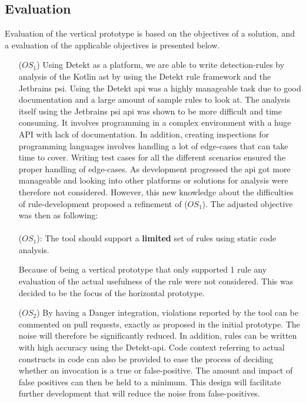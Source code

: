 \documentclass{report}
\begin{document}
\subsection*{Evaluation}
Evaluation of the vertical prototype is based on the objectives of a solution, and a evaluation of the applicable objectives is presented below.
\begin{itemize}
    \item [(\(OS_{1}\))] Using Detekt as a platform, we are able to write detection-rules by analysis of the Kotlin \gls{ast} by using the Detekt rule framework and the  Jetbrains \gls{psi}. Using the Detekt \gls{api} was a highly manageable task due to good documentation and a large amount of sample rules to look at. The analysis itself using the Jetbrains \gls{psi} \gls{api} was shown to be more difficult and time consuming. It involves programming in a complex environment with a huge API with lack of documentation. In addition, creating inspections for programming languages involves handling a lot of edge-cases that can take time to cover. Writing test cases for all the different scenarios ensured the proper handling of edge-cases. As development progressed the \gls{api} got more manageable and looking into other platforms or solutions for analysis were therefore not considered. However, this new knowledge about the difficulties of rule-development proposed a refinement of (\(OS_{1}\)). The adjusted objective was then as following: \\\\(\(OS_{1}\)): The tool should  support a \textbf{limited} set of rules using static code analysis. \label{vertical-os1}
    
    Because of being a vertical prototype that only supported 1 rule any evaluation of the actual usefulness of the rule were not considered. This was decided to be the focus of the horizontal prototype.
    
    \item [(\(OS_{2}\))] By having a Danger integration, violations reported by the tool can be commented on pull requests, exactly as proposed in the initial prototype. The noise will therefore be significantly reduced. In addition, rules can be written with high accuracy using the Detekt-api. Code context referring to actual constructs in code can also be provided to ease the process of deciding whether an invocation is a true or false-positive. The amount and impact of false positives can then be held to a minimum. This design will facilitate further development that will reduce the noise from false-positives. 
    

\end{itemize}
\end{document}
